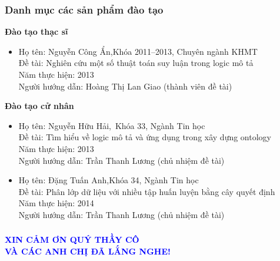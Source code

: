 \documentclass[notheorems,xcolor=dvipsnames]{beamer}
\begin{document}
\begin{frame}\frametitle{\bf Danh mục các sản phẩm đào tạo}
{\bf Đào tạo thạc sĩ}
\begin{small}
	\begin{itemize}
		\item Họ tên: Nguyễn Công Ẩn,\qquad\;Khóa 2011--2013, Chuyên ngành KHMT\\	
		Đề tài: Nghiên cứu một số thuật toán suy luận trong logic mô tả\\	
		Năm thực hiện: 2013\\
		Người hướng dẫn: Hoàng Thị Lan Giao (thành viên đề tài)
	\end{itemize}
\end{small}

{\bf Đào tạo cử nhân}
\begin{small}
	\begin{itemize}
		\item Họ tên: Nguyễn Hữu Hải,\qquad\, Khóa 33, Ngành Tin học\\	
		Đề tài: Tìm hiểu về logic mô tả và ứng dụng trong xây dựng ontology\\	
		Năm thực hiện: 2013\\	
		Người hướng dẫn: Trần Thanh Lương (chủ nhiệm đề tài)
		
		\item Họ tên: Đặng Tuấn Anh,\qquad\;\;\;Khóa 34, Ngành Tin học\\	
		Đề tài: Phân lớp dữ liệu với nhiều tập huấn luyện bằng cây quyết định\\	
		Năm thực hiện: 2014\\	
		Người hướng dẫn: Trần Thanh Lương (chủ nhiệm đề tài)
	\end{itemize}
\end{small}
\end{frame}

\begin{frame}\frametitle{}
	\begin{center}
		\textcolor{blue}{\Large \bf XIN CẢM ƠN QUÝ THẦY CÔ\\[0.5ex]
			VÀ CÁC ANH CHỊ ĐÃ LẮNG NGHE!}
	\end{center}

\end{frame}
\end{document}
